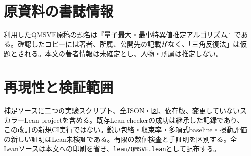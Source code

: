 \documentclass[11pt,a4paper]{article}
\begin{document}
{\section{原資料の書誌情報}
利用したQMSVE原稿の題名は『量子最大・最小特異値推定アルゴリズム』である。確認したコピーには著者、所属、公開先の記載がなく、「三角反復法」は仮題とされる。本文の著者情報は未確定とし、人物・所属は推定しない。
\section{再現性と検証範囲}
補足ソースに二つの実験スクリプト、全JSON・図、依存版、変更していないスカラーLean projectを含める。既存Lean checkerの成功は継承した記録であり、この改訂の新規CI実行ではない。鋭い包絡・収束率・多項式baseline・摂動評価の新しい証明はLean未検証である。有限の数値検査と手証明を区別する。全Leanソースは本文への印刷を省き、\texttt{lean/QMSVE.lean}として配布する。

}
\end{document}
